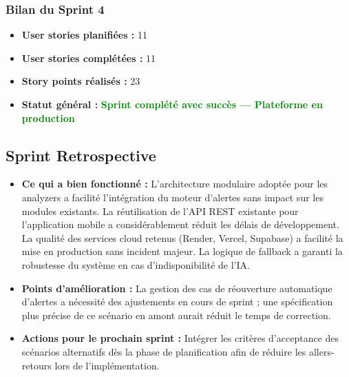 \documentclass[a4paper,12pt]{report}
\begin{document}
\subsubsection*{Bilan du Sprint 4}

\begin{itemize}
    \item \textbf{User stories planifiées :} 11
    \item \textbf{User stories complétées :} 11
    \item \textbf{Story points réalisés :} 23
    \item \textbf{Statut général :}
          \textcolor{green}{\textbf{Sprint complété avec succès --- Plateforme en production}}
\end{itemize}

\subsection{Sprint Retrospective}

\begin{itemize}
    \item \textbf{Ce qui a bien fonctionné :}
          L'architecture modulaire adoptée pour les analyzers a facilité
          l'intégration du moteur d'alertes sans impact sur les modules
          existants. La réutilisation de l'API REST existante pour l'application mobile
          a considérablement réduit les délais de développement. La qualité des services
          cloud retenus (Render, Vercel, Supabase) a facilité la mise en production
          sans incident majeur. La logique de fallback a garanti la robustesse du
          système en cas d'indisponibilité de l'IA.

    \item \textbf{Points d'amélioration :}
          La gestion des cas de réouverture automatique d'alertes a
          nécessité des ajustements en cours de sprint ; une spécification
          plus précise de ce scénario en amont aurait réduit le temps de
          correction.

    \item \textbf{Actions pour le prochain sprint :}
          Intégrer les critères d'acceptance des scénarios alternatifs dès
          la phase de planification afin de réduire les allers-retours lors
          de l'implémentation.
\end{itemize}
\end{document}
